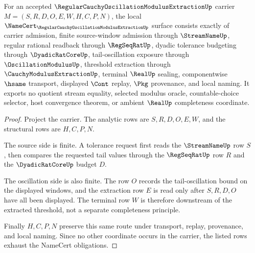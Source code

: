 \begin{theorem}
\label{thm:regular-cauchy-oscillation-modulus-extraction-namecert-obligations}
For an accepted $\RegularCauchyOscillationModulusExtractionUp$ carrier $M=(S,R,D,O,E,W,H,C,P,N)$, the local $\NameCert_{\RegularCauchyOscillationModulusExtractionUp}$ surface consists exactly of carrier admission, finite source-window admission through $\StreamNameUp$, regular rational readback through $\RegSeqRatUp$, dyadic tolerance budgeting through $\DyadicRatCoreUp$, tail-oscillation exposure through $\OscillationModulusUp$, threshold extraction through $\CauchyModulusExtractionUp$, terminal $\RealUp$ sealing, componentwise $\hsame$ transport, displayed $\Cont$ replay, $\Pkg$ provenance, and local naming. It exports no quotient stream equality, selected modulus oracle, countable-choice selector, host convergence theorem, or ambient $\RealUp$ completeness coordinate.
\end{theorem}
\begin{proof}
Project the carrier. The analytic rows are $S,R,D,O,E,W$, and the structural rows are $H,C,P,N$.

The source side is finite. A tolerance request first reads the $\StreamNameUp$ row $S$, then compares the requested tail values through the $\RegSeqRatUp$ row $R$ and the $\DyadicRatCoreUp$ budget $D$.

The oscillation side is also finite. The row $O$ records the tail-oscillation bound on the displayed windows, and the extraction row $E$ is read only after $S,R,D,O$ have all been displayed. The terminal row $W$ is therefore downstream of the extracted threshold, not a separate completeness principle.

Finally $H,C,P,N$ preserve this same route under transport, replay, provenance, and local naming. Since no other coordinate occurs in the carrier, the listed rows exhaust the NameCert obligations.
\end{proof}

